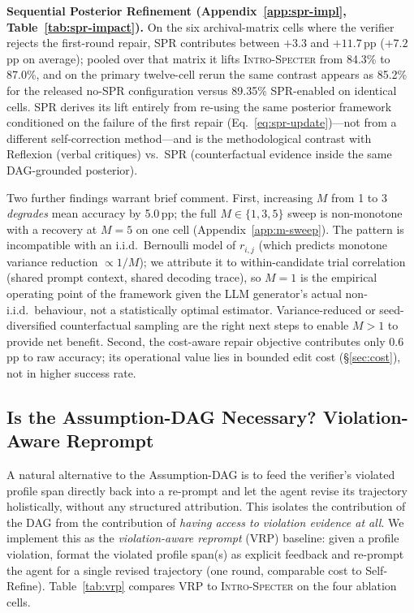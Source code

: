 \documentclass{article}
\newcommand{\method}{\textsc{Intro-Specter}\xspace}
\begin{document}
\textbf{Sequential Posterior Refinement (Appendix~\ref{app:spr-impl}, Table~\ref{tab:spr-impact}).} On the six archival-matrix cells where the verifier rejects the first-round repair, SPR contributes between $+3.3$ and $+11.7$\,pp ($+7.2$\,pp on average); pooled over that matrix it lifts \method from 84.3\% to 87.0\%, and on the primary twelve-cell rerun the same contrast appears as 85.2\% for the released no-SPR configuration versus 89.35\% SPR-enabled on identical cells. SPR derives its lift entirely from re-using the same posterior framework conditioned on the failure of the first repair (Eq.~\ref{eq:spr-update})---not from a different self-correction method---and is the methodological contrast with Reflexion (verbal critiques) vs.\ SPR (counterfactual evidence inside the same DAG-grounded posterior).

Two further findings warrant brief comment. First, increasing $M$ from 1 to 3 \emph{degrades} mean accuracy by 5.0\,pp; the full $M{\in}\{1,3,5\}$ sweep is non-monotone with a recovery at $M{=}5$ on one cell (Appendix~\ref{app:m-sweep}). The pattern is incompatible with an i.i.d.\ Bernoulli model of $r_{i,j}$ (which predicts monotone variance reduction $\propto 1/M$); we attribute it to within-candidate trial correlation (shared prompt context, shared decoding trace), so $M{=}1$ is the empirical operating point of the framework given the LLM generator's actual non-i.i.d.\ behaviour, not a statistically optimal estimator. Variance-reduced or seed-diversified counterfactual sampling are the right next steps to enable $M{>}1$ to provide net benefit. Second, the cost-aware repair objective contributes only $0.6$\,pp to raw accuracy; its operational value lies in bounded edit cost (\S\ref{sec:cost}), not in higher success rate.

\subsection{Is the Assumption-DAG Necessary? Violation-Aware Reprompt}\label{sec:vrp}

A natural alternative to the Assumption-DAG is to feed the verifier's violated profile span directly back into a re-prompt and let the agent revise its trajectory holistically, without any structured attribution. This isolates the contribution of the DAG from the contribution of \emph{having access to violation evidence at all}. We implement this as the \emph{violation-aware reprompt} (VRP) baseline: given a profile violation, format the violated profile span(s) as explicit feedback and re-prompt the agent for a single revised trajectory (one round, comparable cost to Self-Refine). Table~\ref{tab:vrp} compares VRP to \method on the four ablation cells.
\end{document}
